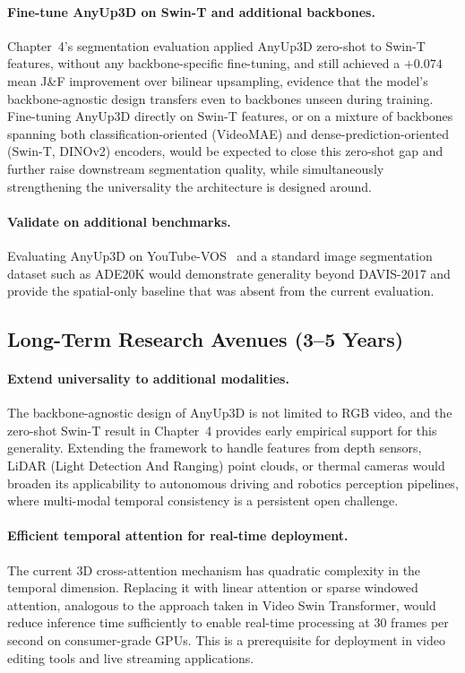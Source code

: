 \paragraph{Fine-tune AnyUp3D on Swin-T and additional backbones.}
Chapter~4's segmentation evaluation applied AnyUp3D zero-shot to Swin-T features, without any backbone-specific fine-tuning, and still achieved a $+0.074$ mean J\&F improvement over bilinear upsampling, evidence that the model's backbone-agnostic design transfers even to backbones unseen during training.
Fine-tuning AnyUp3D directly on Swin-T features, or on a mixture of backbones spanning both classification-oriented (VideoMAE) and dense-prediction-oriented (Swin-T, DINOv2) encoders, would be expected to close this zero-shot gap and further raise downstream segmentation quality, while simultaneously strengthening the universality the architecture is designed around.

\paragraph{Validate on additional benchmarks.}
Evaluating AnyUp3D on YouTube-VOS~\cite{xu2018youtube} and a standard image segmentation dataset such as ADE20K would demonstrate generality beyond DAVIS-2017 and provide the spatial-only baseline that was absent from the current evaluation.

\subsection{Long-Term Research Avenues (3--5 Years)}

\paragraph{Extend universality to additional modalities.}
The backbone-agnostic design of AnyUp3D is not limited to RGB video, and the zero-shot Swin-T result in Chapter~4 provides early empirical support for this generality.
Extending the framework to handle features from depth sensors, LiDAR (Light Detection And Ranging) point clouds, or thermal cameras would broaden its applicability to autonomous driving and robotics perception pipelines, where multi-modal temporal consistency is a persistent open challenge.

\paragraph{Efficient temporal attention for real-time deployment.}
The current 3D cross-attention mechanism has quadratic complexity in the temporal dimension.
Replacing it with linear attention or sparse windowed attention, analogous to the approach taken in Video Swin Transformer, would reduce inference time sufficiently to enable real-time processing at 30 frames per second on consumer-grade GPUs.
This is a prerequisite for deployment in video editing tools and live streaming applications.


